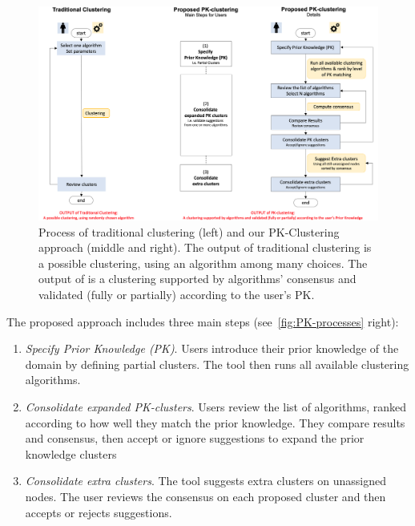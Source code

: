 \begin{figure}[!ht]
    \centering
    \includegraphics[width=\textwidth]{static/figures/PK-Clustering/VISPaperFigures/pkprocess}
    \caption{Process of traditional clustering (left) and our PK-Clustering approach (middle and right). The output of traditional clustering is a possible clustering, using an algorithm among many choices. The output of \pkclustering is a clustering supported by algorithms' consensus and validated (fully or partially) according to the user's PK.}
\label{fig:PK-processes}
\end{figure}
The proposed approach includes three main steps (see~\autoref{fig:PK-processes} right):
\begin{enumerate}[nosep]
\item \textit{Specify Prior Knowledge (PK)}. Users introduce their prior knowledge of the domain by defining partial clusters. The tool then runs all available clustering algorithms.
\item \textit{Consolidate expanded PK-clusters}. Users review the list of algorithms, ranked according to how well they match the prior knowledge.  They compare results and consensus, then accept or ignore suggestions to expand the prior knowledge clusters
\item \textit{Consolidate extra clusters}. The tool suggests extra clusters on unassigned nodes. The user reviews the consensus on each proposed cluster and then accepts or rejects suggestions.
\end{enumerate}

